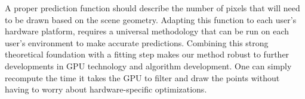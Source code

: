 A proper prediction function should describe the number
of pixels that will need to be drawn based on the scene geometry.
Adapting this function
to each user's
hardware platform, requires a universal methodology that can be run on
each user's environment to make accurate predictions.
Combining this strong theoretical foundation with a fitting step makes our
method robust to further developments in GPU technology and algorithm 
development. One can simply recompute the time it takes the GPU to filter and
draw the points without having to worry about hardware-specific optimizations.

